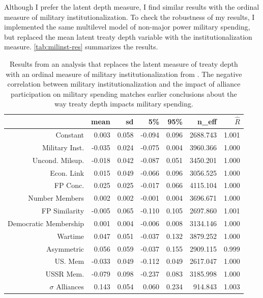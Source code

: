 \documentclass[12pt]{article}
\begin{document}
Although I prefer the latent depth measure, I find similar results with the ordinal measure of military institutionalization. 
To check the robustness of my results, I implemented the same multilevel model of non-major power military spending, but replaced the mean latent treaty depth variable with the institutionalization measure. 
\autoref{tab:milinst-res} summarizes the results. 


\begin{table}[ht]
\centering
\begin{tabular}{rrrrrrr}
  \hline
 & mean & sd & 5\% & 95\% & n\_eff & $\hat{R}$ \\ 
  \hline
Constant & 0.003 & 0.058 & -0.094 & 0.096 & 2688.743 & 1.001 \\ 
  Military Inst. & -0.035 & 0.024 & -0.075 & 0.004 & 3960.366 & 1.000 \\ 
  Uncond. Milsup. & -0.018 & 0.042 & -0.087 & 0.051 & 3450.201 & 1.000 \\ 
  Econ. Link & 0.015 & 0.049 & -0.066 & 0.096 & 3056.525 & 1.000 \\ 
  FP Conc. & 0.025 & 0.025 & -0.017 & 0.066 & 4115.104 & 1.000 \\ 
  Number Members & 0.002 & 0.002 & -0.001 & 0.004 & 3696.671 & 1.000 \\ 
  FP Similarity & -0.005 & 0.065 & -0.110 & 0.105 & 2697.860 & 1.001 \\ 
  Democratic Membership & 0.001 & 0.004 & -0.006 & 0.008 & 3134.146 & 1.000 \\ 
  Wartime & 0.047 & 0.051 & -0.037 & 0.132 & 3879.252 & 1.000 \\ 
  Asymmetric & 0.056 & 0.059 & -0.037 & 0.155 & 2909.115 & 0.999 \\ 
  US. Mem & -0.033 & 0.049 & -0.112 & 0.049 & 2617.047 & 1.000 \\ 
  USSR Mem. & -0.079 & 0.098 & -0.237 & 0.083 & 3185.998 & 1.000 \\ 
  $\sigma$ Alliances & 0.143 & 0.054 & 0.060 & 0.234 & 914.843 & 1.003 \\ 
   \hline
\end{tabular}
\caption{Results from an analysis that replaces the latent measure of treaty depth with an ordinal measure of military institutionalization from \citet{LeedsAnac2005}. The negative correlation between military institutionalization and the impact of alliance participation on military spending matches earlier conclusions about the way treaty depth impacts military spending.}
\label{tab:milinst-res}
\end{table}
\end{document}

